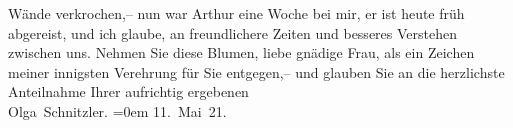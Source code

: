 \begin{ledgroupsized}[t]{13cm}
               Wände verkrochen,– nun war Arthur eine Woche
               bei mir, er ist heute früh abgereist, und ich glaube, an freundlichere Zeiten und
               besseres Verstehen zwischen uns.\pend
           \pstart
           Nehmen Sie diese Blumen, liebe gnädige Frau, als ein Zeichen meiner innigsten
               Verehrung für Sie entgegen,– und glauben Sie an die herzlichste Anteilnahme{\pb}\pend
           \pstart
           Ihrer aufrichtig ergebenen{\\[\baselineskip]}\spacefill\mbox{Olga Schnitzler.}\pend
           \leftskip=0em{}\pstart
           \noindent{}11. Mai 21. \pend
           
         
         \endnumbering{}\end{ledgroupsized}  \newcommand{\dateiname}{L02367}\newcommand{\titel}{Olga Schnitzler an Anna Bahr-Mildenburg, 11. 5. 1921}\newcommand{\editorInnen}{ Martin Anton Müller und Gerd-Hermann Susen}
      